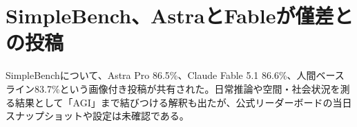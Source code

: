 \section{SimpleBench、AstraとFableが僅差との投稿}
SimpleBenchについて、Astra Pro 86.5\%、Claude Fable 5.1 86.6\%、人間ベースライン83.7\%という画像付き投稿が共有された。日常推論や空間・社会状況を測る結果として「AGI」まで結びつける解釈も出たが、公式リーダーボードの当日スナップショットや設定は未確認である。
